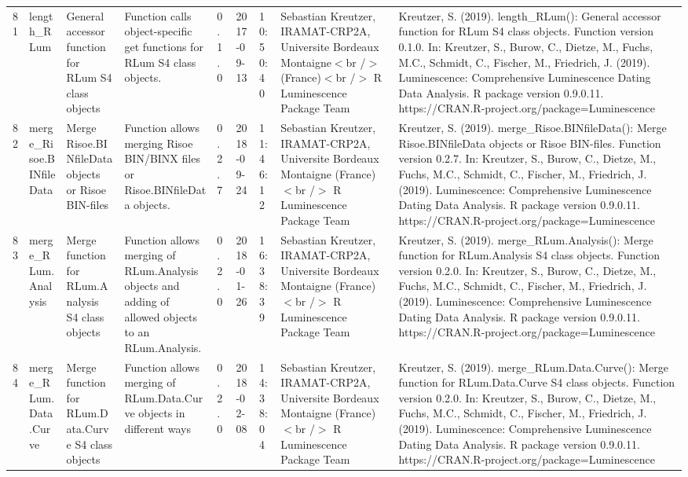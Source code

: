 \begin{table}[ht]
\begin{tabular}{rllllllll}
  81 & length\_RLum & General accessor function for RLum S4 class objects & Function calls object-specific get functions for RLum S4 class objects. & 0.1.0 & 2017-09-13 & 10:50:40
 & Sebastian Kreutzer, IRAMAT-CRP2A, Universite Bordeaux Montaigne$<$br /$>$ (France)$<$br /$>$  R Luminescence Package Team & Kreutzer, S. (2019). length\_RLum(): General accessor function for RLum S4 class objects. Function version 0.1.0. In: Kreutzer, S., Burow, C., Dietze, M., Fuchs, M.C., Schmidt, C., Fischer, M., Friedrich, J. (2019). Luminescence: Comprehensive Luminescence Dating Data Analysis. R package version 0.9.0.11. https://CRAN.R-project.org/package=Luminescence
 \\ 
  82 & merge\_Risoe.BINfileData & Merge Risoe.BINfileData objects or Risoe BIN-files & Function allows merging Risoe BIN/BINX files or Risoe.BINfileData objects. & 0.2.7 & 2018-09-24 & 11:46:12
 & Sebastian Kreutzer, IRAMAT-CRP2A, Universite Bordeaux Montaigne (France)$<$br /$>$  R Luminescence Package Team & Kreutzer, S. (2019). merge\_Risoe.BINfileData(): Merge Risoe.BINfileData objects or Risoe BIN-files. Function version 0.2.7. In: Kreutzer, S., Burow, C., Dietze, M., Fuchs, M.C., Schmidt, C., Fischer, M., Friedrich, J. (2019). Luminescence: Comprehensive Luminescence Dating Data Analysis. R package version 0.9.0.11. https://CRAN.R-project.org/package=Luminescence
 \\ 
  83 & merge\_RLum.Analysis & Merge function for RLum.Analysis S4 class objects & Function allows merging of RLum.Analysis objects and adding of allowed objects to an RLum.Analysis. & 0.2.0 & 2018-01-26 & 16:38:39
 & Sebastian Kreutzer, IRAMAT-CRP2A, Universite Bordeaux Montaigne (France)$<$br /$>$  R Luminescence Package Team & Kreutzer, S. (2019). merge\_RLum.Analysis(): Merge function for RLum.Analysis S4 class objects. Function version 0.2.0. In: Kreutzer, S., Burow, C., Dietze, M., Fuchs, M.C., Schmidt, C., Fischer, M., Friedrich, J. (2019). Luminescence: Comprehensive Luminescence Dating Data Analysis. R package version 0.9.0.11. https://CRAN.R-project.org/package=Luminescence
 \\ 
  84 & merge\_RLum.Data.Curve & Merge function for RLum.Data.Curve S4 class objects & Function allows merging of RLum.Data.Curve objects in different ways & 0.2.0 & 2018-02-08 & 14:38:04
 & Sebastian Kreutzer, IRAMAT-CRP2A, Universite Bordeaux Montaigne (France)$<$br /$>$  R Luminescence Package Team & Kreutzer, S. (2019). merge\_RLum.Data.Curve(): Merge function for RLum.Data.Curve S4 class objects. Function version 0.2.0. In: Kreutzer, S., Burow, C., Dietze, M., Fuchs, M.C., Schmidt, C., Fischer, M., Friedrich, J. (2019). Luminescence: Comprehensive Luminescence Dating Data Analysis. R package version 0.9.0.11. https://CRAN.R-project.org/package=Luminescence

\end{tabular}
\end{table}
